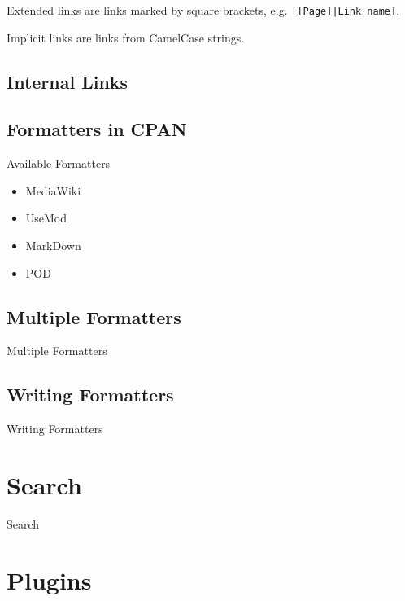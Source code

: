 Extended links are links marked by square brackets, e.g.
\verb+[[Page]|Link name]+.

Implicit links are links from CamelCase strings.

\subsection{Internal Links}


\subsection{Formatters in CPAN}

\begin{frame}{Available Formatters}
 \begin{itemize}
  \item<1-> MediaWiki
  \item<2-> UseMod
  \item<3-> MarkDown
  \item<4-> POD
 \end{itemize}
\end{frame}

\subsection{Multiple Formatters}

\begin{frame}{Multiple Formatters}
\end{frame}

\subsection{Writing Formatters}


\begin{frame}{Writing Formatters}
\end{frame}

\section{Search}

\begin{frame}{Search}
\end{frame}

\section{Plugins}

